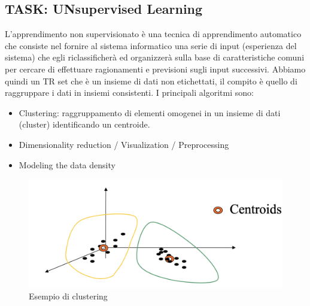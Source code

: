 \documentclass{article}
\begin{document}
\subsection{TASK: UNsupervised Learning}
L'apprendimento non supervisionato è una tecnica di apprendimento automatico che consiste nel fornire al sistema informatico una serie di input (esperienza del sistema) che egli riclassificherà ed organizzerà sulla base di caratteristiche comuni per cercare di effettuare ragionamenti e previsioni sugli input successivi. Abbiamo quindi un TR set che è un insieme di dati non etichettati, il compito è quello di raggruppare i dati in insiemi consistenti. I principali algoritmi sono:
\begin{itemize}
    \item Clustering: raggruppamento di elementi omogenei in un insieme di dati (cluster) identificando un centroide.
    \item Dimensionality reduction / Visualization / Preprocessing
    \item Modeling the data density
\end{itemize}
\begin{figure}[H]
    \centering
    \includegraphics[scale=0.4]{Images/clustering.png}
    \caption{Esempio di clustering}
\end{figure}
\end{document}

